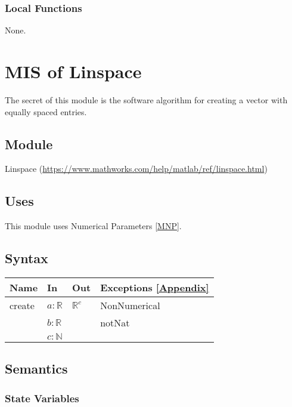 \documentclass[12pt, titlepage]{article}
\begin{document}
\subsubsection{Local Functions} 

None. 

\newpage 

\section{MIS of Linspace} \label{MLIN}

The secret of this module is the software algorithm for creating a vector with 
equally spaced entries. 

\subsection{Module}

Linspace (\url{https://www.mathworks.com/help/matlab/ref/linspace.html})

\subsection{Uses}

This module uses Numerical Parameters \ref{MNP}. 

\subsection{Syntax}

\begin{center}
	\begin{tabular}{p{2cm} p{6cm} p{6cm} p{3cm}}
		\hline
		\textbf{Name} & \textbf{In} & \textbf{Out} & \textbf{Exceptions} 
		\ref{Appendix}\\
		\hline
		create & $a : \mathbb{R}$ & $\mathbb{R}^{c}$ & 
		NonNumerical \\
		& $b : \mathbb{R}$ &  & notNat \\  
		& $c : \mathbb{N}$ &  &  \\ 
		\hline
	\end{tabular}
\end{center}

\subsection{Semantics}

\subsubsection{State Variables}
\end{document}
